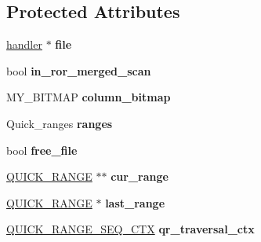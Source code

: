 \subsection*{Protected Attributes}
\begin{DoxyCompactItemize}
\item 
\mbox{\label{classQUICK__RANGE__SELECT_abb8485bbefaaee48fdc8c72d40569b74}} 
\mbox{\hyperlink{classhandler}{handler}} $\ast$ {\bfseries file}
\item 
\mbox{\label{classQUICK__RANGE__SELECT_a403c0ed2e46ce79b836f9faf38f0d1de}} 
bool {\bfseries in\+\_\+ror\+\_\+merged\+\_\+scan}
\item 
\mbox{\label{classQUICK__RANGE__SELECT_a1d35fc85ac3d816a011b112dc2c6f95f}} 
M\+Y\+\_\+\+B\+I\+T\+M\+AP {\bfseries column\+\_\+bitmap}
\item 
\mbox{\label{classQUICK__RANGE__SELECT_afca791ac8764f5f527aa154ebd401987}} 
Quick\+\_\+ranges {\bfseries ranges}
\item 
\mbox{\label{classQUICK__RANGE__SELECT_a4815ebcf2f7d72f9de5a46f47f79e1d9}} 
bool {\bfseries free\+\_\+file}
\item 
\mbox{\label{classQUICK__RANGE__SELECT_a79c28a7c6a2759563d5236593df68e55}} 
\mbox{\hyperlink{classQUICK__RANGE}{Q\+U\+I\+C\+K\+\_\+\+R\+A\+N\+GE}} $\ast$$\ast$ {\bfseries cur\+\_\+range}
\item 
\mbox{\label{classQUICK__RANGE__SELECT_aad0f16e1a391d0ff65fc531e55b9dba0}} 
\mbox{\hyperlink{classQUICK__RANGE}{Q\+U\+I\+C\+K\+\_\+\+R\+A\+N\+GE}} $\ast$ {\bfseries last\+\_\+range}
\item 
\mbox{\label{classQUICK__RANGE__SELECT_a83f5c018af83a9f86d005cd39708058d}} 
\mbox{\hyperlink{structst__quick__range__seq__ctx}{Q\+U\+I\+C\+K\+\_\+\+R\+A\+N\+G\+E\+\_\+\+S\+E\+Q\+\_\+\+C\+TX}} {\bfseries qr\+\_\+traversal\+\_\+ctx}
\item 
\mbox{\label{classQUICK__RANGE__SELECT_ac6d0414e3188254e8e8e342bcf5fd5cc}} 
$$
\end{DoxyCompactItemize}
